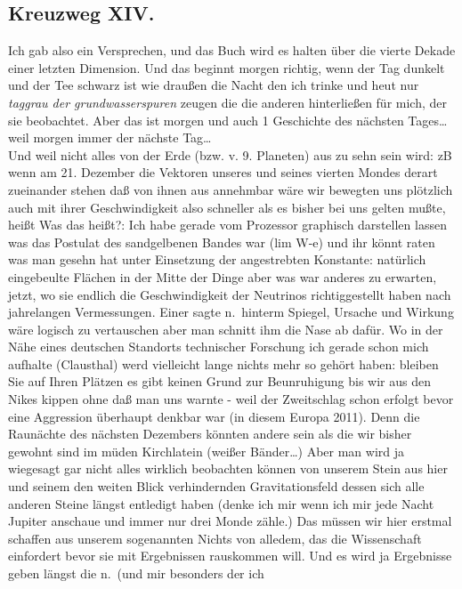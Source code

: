 \documentclass[
]{article}
\author{}
\date{\vspace{-2.5em}}
\begin{document}
\subsection{Kreuzweg XIV.}\label{kreuzweg-xiv.}

Ich gab also ein Versprechen, und das Buch wird es halten über die
vierte Dekade einer letzten Dimension. Und das beginnt morgen richtig,
wenn der Tag dunkelt und der Tee schwarz ist wie draußen die Nacht den
ich trinke und heut nur \emph{taggrau der grundwasserspuren} zeugen die
die anderen hinterließen für mich, der sie beobachtet. Aber das ist
morgen und auch 1 Geschichte des nächsten Tages\ldots{} weil morgen
immer der nächste Tag\ldots{}\\
Und weil nicht alles von der Erde (bzw. v. 9. Planeten) aus zu sehn sein
wird: zB wenn am 21. Dezember die Vektoren unseres und seines vierten
Mondes derart zueinander stehen daß von ihnen aus annehmbar wäre wir
bewegten uns plötzlich auch mit ihrer Geschwindigkeit also schneller als
es bisher bei uns gelten mußte, heißt Was das heißt?: Ich habe gerade
vom Prozessor graphisch darstellen lassen was das Postulat des
sandgelbenen Bandes war (lim W-e) und ihr könnt raten was man gesehn hat
unter Einsetzung der angestrebten Konstante: natürlich eingebeulte
Flächen in der Mitte der Dinge aber was war anderes zu erwarten, jetzt,
wo sie endlich die Geschwindigkeit der Neutrinos richtiggestellt haben
nach jahrelangen Vermessungen. Einer sagte n.~hinterm Spiegel, Ursache
und Wirkung wäre logisch zu vertauschen aber man schnitt ihm die Nase ab
dafür. Wo in der Nähe eines deutschen Standorts technischer Forschung
ich gerade schon mich aufhalte (Clausthal) werd vielleicht lange nichts
mehr so gehört haben: bleiben Sie auf Ihren Plätzen es gibt keinen Grund
zur Beunruhigung bis wir aus den Nikes kippen ohne daß man uns warnte -
weil der Zweitschlag schon erfolgt bevor eine Aggression überhaupt
denkbar war (in diesem Europa 2011). Denn die Raunächte des nächsten
Dezembers könnten andere sein als die wir bisher gewohnt sind im müden
Kirchlatein (weißer Bänder\ldots) Aber man wird ja wiegesagt gar nicht
alles wirklich beobachten können von unserem Stein aus hier und seinem
den weiten Blick verhindernden Gravitationsfeld dessen sich alle anderen
Steine längst entledigt haben (denke ich mir wenn ich mir jede Nacht
Jupiter anschaue und immer nur drei Monde zähle.) Das müssen wir hier
erstmal schaffen aus unserem sogenannten Nichts von alledem, das die
Wissenschaft einfordert bevor sie mit Ergebnissen rauskommen will. Und
es wird ja Ergebnisse geben längst die n.~(und mir besonders der ich
\end{document}
